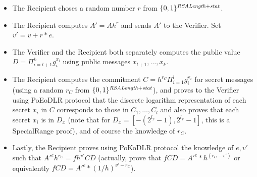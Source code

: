 \begin{itemize}
\item The Recipient choses a random number $r$ from $\{0,1\}^{\mathit{RSALength} + \mathit{stat}}$.
\item The Recipient computes $A' = A h^r$ and sends $A'$ to the Verifier. Set $v' = v + r*e$.
\item The Verifier and the Recipient both separately computes the public value $D = \Pi_{i=l+1}^{k} g_{i}^{x_i}$ using public messages $x_{l+1},\ldots,x_k$.
\item The Recipient computes the commitment $C = h^{r_C} \Pi_{i=1}^{l} g_{i}^{x_i}$ for secret messages (using a random $r_C$ from $\{0,1\}^{\mathit{RSALength} + \mathit{stat}}$), and proves to the Verifier using PoEoDLR protocol that the discrete logarithm representation of each secret $x_i$ in $C$ corresponds to those in $C_1,\ldots,C_l$ and also proves that each secret $x_i$ is in $D_x$ (note that for $D_x = [-(2^{l_x}-1) , 2^{l_x}-1]$, this is a SpecialRange proof), and of course the knowledge of $r_C$. \;
\item Lastly, the Recipient proves using PoKoDLR protocol the knowledge of $e,v'$ such that $A'^e h^{r_C} = f h^{v'} C D$ (actually, prove that $f C D = A'^e * h^{(r_C - v')}$ or equivalently $f C D = A'^e * (1/h)^{v' - r_C}$).
\end{itemize}
